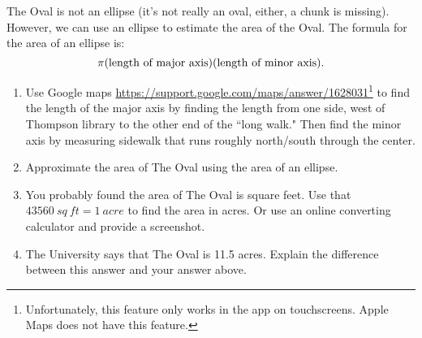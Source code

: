 \documentclass[nooutcomes,noauthor,handout]{../ximera}
\begin{document}
\begin{question}%
 The Oval is not an ellipse (it's not really an oval, either, a chunk is missing). However, we can use an ellipse to estimate the area of the Oval. The formula for the area of an ellipse is:
 \[\pi(\textnormal{length of major axis})(\textnormal{length of minor axis}).\] 
 
\begin{enumerate}
 \item 
 Use Google maps \url{https://support.google.com/maps/answer/1628031}\footnote{Unfortunately, this feature only works in the app on touchscreens. Apple Maps does not have this feature.} to find the length of the major axis by finding the length from one side, west of Thompson library to the other end of the ``long walk." Then find the minor axis by measuring sidewalk that runs roughly north/south through the center.
 
  \item Approximate the area of The Oval using the area of an ellipse.
  \item You probably found the area of The Oval is square feet. Use that $43560\ sq \ ft= 1\ acre$ to find the area in acres. Or use an online converting calculator and provide a screenshot.
  \item The University says that The Oval is 11.5 acres. Explain the difference between this answer and your answer above.
 \end{enumerate}
\end{question}
\end{document}
